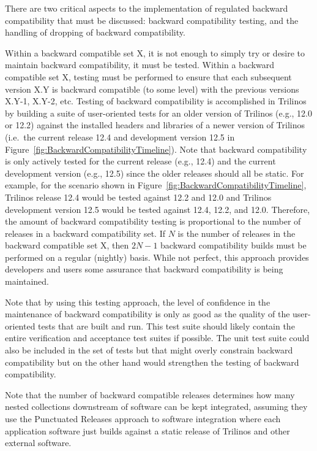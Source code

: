 \documentclass[11pt]{SANDreport}
\begin{document}
There are two critical aspects to the implementation of regulated
backward compatibility that must be discussed: backward compatibility
testing, and the handling of dropping of backward compatibility.

Within a backward compatible set X, it is not enough to simply try or
desire to maintain backward compatibility, it must be tested.  Within a
backward compatible set X, testing must be performed to ensure that
each subsequent version X.Y is backward compatible (to some level)
with the previous versions X.Y-1, X.Y-2, etc.  Testing of backward
compatibility is accomplished in Trilinos by building a suite of
user-oriented tests for an older version of Trilinos (e.g., 12.0 or
12.2) against the installed headers and libraries of a newer version
of Trilinos (i.e.\ the current release 12.4 and development version
12.5 in Figure~\ref{fig:BackwardCompatibilityTimeline}).  Note that
backward compatibility is only actively tested for the current release
(e.g., 12.4) and the current development version (e.g., 12.5) since
the older releases should all be static.  For example, for the
scenario shown in Figure~\ref{fig:BackwardCompatibilityTimeline},
Trilinos release 12.4 would be tested against 12.2 and 12.0 and
Trilinos development version 12.5 would be tested against 12.4, 12.2,
and 12.0.  Therefore, the amount of backward compatibility testing is
proportional to the number of releases in a backward compatibility
set.  If $N$ is the number of releases in the backward compatible set
X, then $2 N-1$ backward compatibility builds must be performed on a
regular (nightly) basis.  While not perfect, this approach provides
developers and users some assurance that backward compatibility is
being maintained.

Note that by using this testing approach, the level of confidence in
the maintenance of backward compatibility is only as good as the quality
of the user-oriented tests that are built and run.  This test suite
should likely contain the entire verification and acceptance test
suites if possible.  The unit test suite could also be included in the
set of tests but that might overly constrain backward compatibility
but on the other hand would strengthen the testing of backward
compatibility.

Note that the number of backward compatible releases determines how
many nested collections downstream of software can be kept integrated,
assuming they use the Punctuated Releases approach to software
integration {}\cite{SoftwareIntegrationforCSE09} where each
application software just builds against a static release of Trilinos
and other external software.
\end{document}
